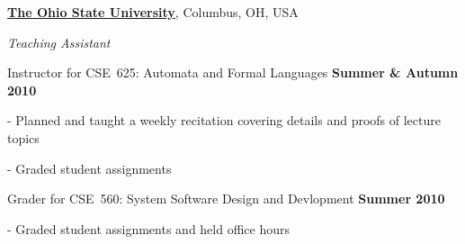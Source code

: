 \href{http://www.osu.edu/}{\textbf{The Ohio State University}},
Columbus, OH, USA
\begin{innerlist}

\item[] \textit{Teaching Assistant}%
    \begin{innerlist}
        \item[] Instructor for CSE~625: Automata and Formal Languages
            \hfill \textbf{Summer \& Autumn 2010}
        \begin{innerlist}
            \item[-] Planned and taught a weekly recitation covering details and proofs of lecture topics
            \item[-] Graded student assignments
        \end{innerlist}


        \item[] Grader for CSE~560: System Software Design and Devlopment
            \hfill \textbf{Summer 2010}
        \begin{innerlist}
            \item[-] Graded student assignments and held office hours
        \end{innerlist}

    \end{innerlist}

\end{innerlist}
